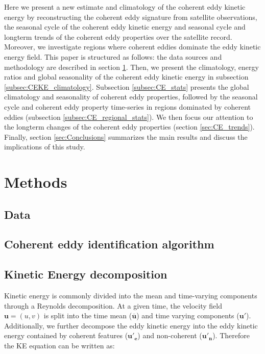 \documentclass[draft,linenumbers]{agujournal2019}
\begin{document}
Here we present a new estimate and climatology of the coherent eddy kinetic energy by reconstructing the coherent eddy signature from satellite observations, the seasonal cycle of the coherent eddy kinetic energy and seasonal cycle and longterm trends of the coherent eddy properties over the satellite record. 
Moreover, we investigate regions where coherent eddies dominate the eddy kinetic energy field. 
This paper is structured as follows:  the data sources and methodology are described in section \ref{sec:Methods}.
Then, we present the climatology, energy ratios and global seasonality of the coherent eddy kinetic energy in subsection \ref{subsec:CEKE_climatology}. 
Subsection \ref{subsec:CE_stats} presents the global climatology and seasonality of coherent eddy properties, followed by the seasonal cycle and coherent eddy property time-series in regions dominated by coherent eddies (subsection \ref{subsec:CE_regional_stats}). 
We then focus our attention to the longterm changes of the coherent eddy properties (section \ref{sec:CE_trends}). 
Finally, section \ref{sec:Conclusions} summarizes the main results and discuss the implications of this study.

\section{Methods}
\label{sec:Methods}
	\subsection{Data}
	

	\subsection{Coherent eddy identification algorithm}


	\subsection{Kinetic Energy decomposition}

	Kinetic energy is commonly divided into the mean and time-varying components through a Reynolds decomposition. At a given time, the velocity field $\mathbf{u} = (u,v)$ is split into the time mean ($\mathbf{\overline{u}}$) and time varying components ($\mathbf{u'}$). Additionally, we further decompose the eddy kinetic energy into the eddy kinetic energy contained by coherent features ($\mathbf{u'_e}$) and non-coherent ($\mathbf{u'_n}$). Therefore the KE equation can be written as:
	
\end{document}
